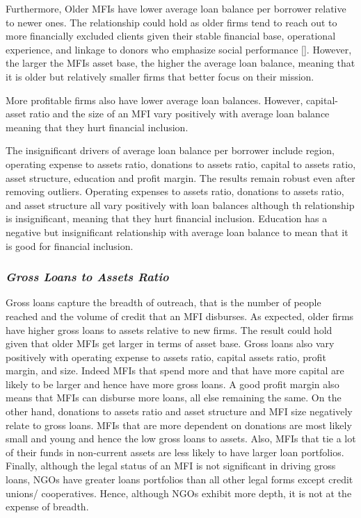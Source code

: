 \documentclass[
]{article}
\begin{document}
Furthermore, Older MFIs have lower average loan balance per borrower
relative to newer ones. The relationship could hold as older firms tend
to reach out to more financially excluded clients given their stable
financial base, operational experience, and linkage to donors who
emphasize social performance {[}{]}. However, the larger the MFIs asset
base, the higher the average loan balance, meaning that it is older but
relatively smaller firms that better focus on their mission.

More profitable firms also have lower average loan balances. However,
capital-asset ratio and the size of an MFI vary positively with average
loan balance meaning that they hurt financial inclusion.

The insignificant drivers of average loan balance per borrower include
region, operating expense to assets ratio, donations to assets ratio,
capital to assets ratio, asset structure, education and profit margin.
The results remain robust even after removing outliers. Operating
expenses to assets ratio, donations to assets ratio, and asset structure
all vary positively with loan balances although th relationship is
insignificant, meaning that they hurt financial inclusion. Education has
a negative but insignificant relationship with average loan balance to
mean that it is good for financial inclusion.

\hypertarget{gross-loans-to-assets-ratio}{%
\subsubsection{\texorpdfstring{\textbf{\emph{Gross Loans to Assets
Ratio}}}{Gross Loans to Assets Ratio}}\label{gross-loans-to-assets-ratio}}

Gross loans capture the breadth of outreach, that is the number of
people reached and the volume of credit that an MFI disburses. As
expected, older firms have higher gross loans to assets relative to new
firms. The result could hold given that older MFIs get larger in terms
of asset base. Gross loans also vary positively with operating expense
to assets ratio, capital assets ratio, profit margin, and size. Indeed
MFIs that spend more and that have more capital are likely to be larger
and hence have more gross loans. A good profit margin also means that
MFIs can disburse more loans, all else remaining the same. On the other
hand, donations to assets ratio and asset structure and MFI size
negatively relate to gross loans. MFIs that are more dependent on
donations are most likely small and young and hence the low gross loans
to assets. Also, MFIs that tie a lot of their funds in non-current
assets are less likely to have larger loan portfolios. Finally, although
the legal status of an MFI is not significant in driving gross loans,
NGOs have greater loans portfolios than all other legal forms except
credit unions/ cooperatives. Hence, although NGOs exhibit more depth, it
is not at the expense of breadth.
\end{document}
